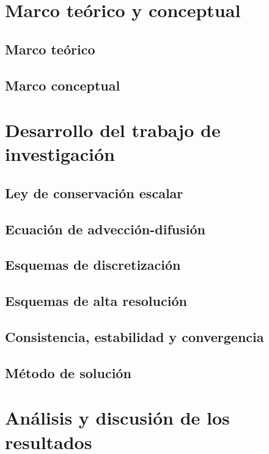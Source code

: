 \documentclass[
  11pt,
  a4paper,
  oneside,
  english,
  spanish
]{TesisUNI}
\begin{document}
\chapter{Marco teórico y conceptual}

\section{Marco teórico}

\section{Marco conceptual}

\chapter{Desarrollo del trabajo de investigación}

\section{Ley de conservación escalar}

\section{Ecuación de advección-difusión}

\section{Esquemas de discretización}

\section{Esquemas de alta resolución}

\section{Consistencia, estabilidad y convergencia}

\section{Método de solución}

\chapter{Análisis y discusión de los resultados}
\end{document}

